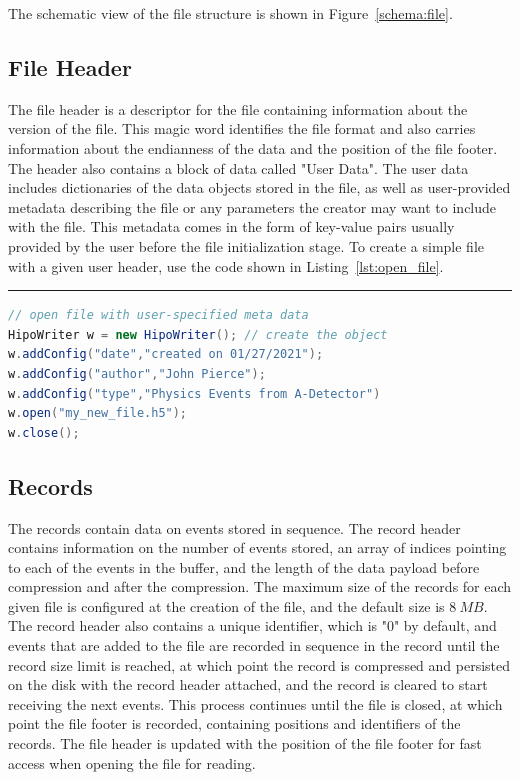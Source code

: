 The schematic view of the file structure is shown in Figure~\ref{schema:file}.

\subsection{File Header}

The file header is a descriptor for the file containing information about the version of the file. This magic word identifies the file format and also carries information about the endianness of the data and the position of the file footer. The header also contains a block of data called "User Data". The user data includes dictionaries of the data objects stored in the file, as well as user-provided metadata describing the file or any parameters the creator may want to include with the file. This metadata comes in the form of key-value pairs usually provided by the user before the file initialization stage. To create a simple file with a given user header, use the code shown in Listing~\ref{lst:open_file}.
\rule{16.5cm}{0.4pt}
\begin{lstlisting}[language=java, caption=Java example for writing a file with meta-data., label=lst:open_file]
// open file with user-specified meta data
HipoWriter w = new HipoWriter(); // create the object
w.addConfig("date","created on 01/27/2021");
w.addConfig("author","John Pierce");
w.addConfig("type","Physics Events from A-Detector")
w.open("my_new_file.h5");
w.close();
\end{lstlisting}


\subsection{Records}

The records contain data on events stored in sequence. The record header contains information on the number of events stored, an array of indices pointing to each of the events in the buffer, and the length of the data payload before compression and after the compression. The maximum size of the records for each given file is configured at the creation of the file, and the default size is $8~MB$. The record header also contains a unique identifier, which is "0" by default, and events that are added to the file are recorded in sequence in the 
record until the record size limit is reached, at which point the record is compressed and persisted on the disk with the record header attached, and the record is cleared to start receiving the next events. This process continues until the file is closed, at which point the file footer is recorded, containing positions and identifiers of the records. The file header is updated with the position of the file footer for fast access when opening the file for reading.

